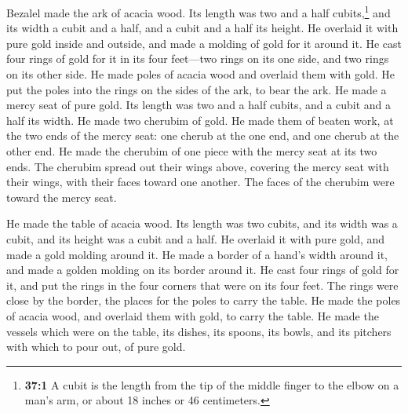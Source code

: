  Bezalel made the ark of acacia wood. Its length was two
and a half cubits,\footnote{\textbf{37:1} A cubit is the length from the
  tip of the middle finger to the elbow on a man's arm, or about 18
  inches or 46 centimeters.} and its width a cubit and a half, and a
cubit and a half its height.  He overlaid it with pure
gold inside and outside, and made a molding of gold for it around it.
 He cast four rings of gold for it in its four feet---two
rings on its one side, and two rings on its other side. 
He made poles of acacia wood and overlaid them with gold. 
He put the poles into the rings on the sides of the ark, to bear the
ark.  He made a mercy seat of pure gold. Its length was
two and a half cubits, and a cubit and a half its width. 
He made two cherubim of gold. He made them of beaten work, at the two
ends of the mercy seat:  one cherub at the one end, and
one cherub at the other end. He made the cherubim of one piece with the
mercy seat at its two ends.  The cherubim spread out their
wings above, covering the mercy seat with their wings, with their faces
toward one another. The faces of the cherubim were toward the mercy
seat.

 He made the table of acacia wood. Its length was two
cubits, and its width was a cubit, and its height was a cubit and a
half.  He overlaid it with pure gold, and made a gold
molding around it.  He made a border of a hand's width
around it, and made a golden molding on its border around it.
 He cast four rings of gold for it, and put the rings in
the four corners that were on its four feet.  The rings
were close by the border, the places for the poles to carry the table.
 He made the poles of acacia wood, and overlaid them with
gold, to carry the table.  He made the vessels which were
on the table, its dishes, its spoons, its bowls, and its pitchers with
which to pour out, of pure gold.

